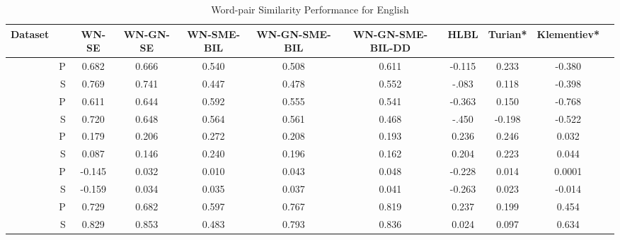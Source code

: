  \begin{table*}[ht]
\caption{Word-pair Similarity Performance for English } %
\label{tbl:en-wp-sim}
\centering %
\tabcolsep=0.09cm

\begin{tabular}{cr c c c c c c c c c} 
\hline\hline %
 Dataset & & WN-SE  & WN-GN-SE & WN-SME-BIL &  WN-GN-SME-BIL & WN-GN-SME-BIL-DD &HLBL & Turian* & Klementiev*
\\ [0.5ex] 
\hline %
                                           &P&0.682&0.666&0.540&0.508&0.611&-0.115&0.233&-0.380 \\[-1ex]
\raisebox{1.5ex}{RubensteinGoodenough65}  &S&0.769&0.741&0.447&0.478&0.552&-.083&0.118&-0.398 \\[1ex]

                                     &  P &0.611&0.644&0.592&0.555&0.541&-0.363&0.150&-0.768 \\[-1ex]
\raisebox{1.5ex}{MillerCharles30}  &  S & 0.720&0.648&0.564&0.561&0.468&-.450&-0.198&-0.522 \\[1ex]

                                   &  P &0.179&0.206&0.272&0.208&0.193&0.236&0.246&0.032 \\[-1ex]
\raisebox{1.5ex}{Finkelstein353}  &  S &0.087&0.146&0.240&0.196&0.162&0.204&0.223&0.044 \\[1ex]

                                  &  P &-0.145&0.032&0.010&0.043&0.048&-0.228&0.014&0.0001 \\[-1ex]
\raisebox{1.5ex}{Szumlanski122}  &  S & -0.159&0.034&0.035&0.037&0.041&-0.263&0.023&-0.014 \\[1ex]

                                  &  P & 0.729&0.682&0.597&0.767&0.819&0.237&0.199&0.454 \\[-1ex]
\raisebox{1.5ex}{YangPowers130}  &  S & 0.829&0.853&0.483&0.793&0.836&0.024&0.097& 0.634 \\[1ex]

\hline %
     
          
 \hline %
\end{tabular}

\label{tab:en-wp-sim}
\end{table*}      



